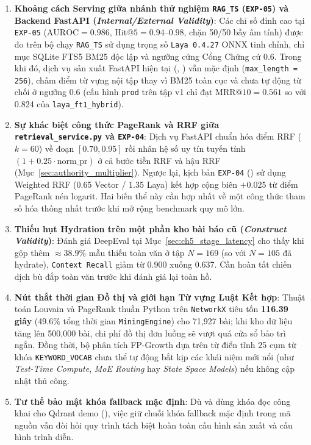 \begin{enumerate}[label=\textbf{\arabic*.}]
  \item \textbf{Khoảng cách Serving giữa nhánh thử nghiệm \texttt{RAG\_TS} (\texttt{EXP-05}) và Backend FastAPI (\textit{Internal/External Validity})}: Các chỉ số đỉnh cao tại \texttt{EXP-05} ($\mathrm{AUROC} = 0.986$, $\mathrm{Hit}@5 = 0.94\text{--}0.98$, chặn 50/50 bẫy âm tính) được đo trên bộ chạy \texttt{RAG\_TS} sử dụng trọng số \texttt{Laya 0.4.27} ONNX tinh chỉnh, chỉ mục SQLite FTS5 BM25 độc lập và ngưỡng cứng Cổng Chứng cứ 0.6. Trong khi đó, dịch vụ sản xuất FastAPI hiện tại (, ) vẫn mặc định  (\texttt{max\_length = 256}), chấm điểm từ vựng nội tập thay vì BM25 toàn cục và chưa tự động từ chối ở ngưỡng 0.6 (cấu hình \texttt{prod} trên tập v1 chỉ đạt $\mathrm{MRR}@10 = 0.561$ so với 0.824 của \texttt{laya\_ft1\_hybrid}).

  \item \textbf{Sự khác biệt công thức PageRank và RRF giữa \texttt{retrieval\_service.py} và \texttt{EXP-04}}: Dịch vụ FastAPI chuẩn hóa điểm RRF ($k=60$) về đoạn $[0.70, 0.95]$ rồi nhân hệ số uy tín tuyến tính $(1 + 0.25 \cdot \mathrm{norm\_pr})$ ở cả bước tiền RRF và hậu RRF (Mục~\ref{sec:authority_multiplier}). Ngược lại, kịch bản \texttt{EXP-04} () sử dụng Weighted RRF (0.65 Vector / 1.35 Laya) kết hợp cộng biên $+0.025$ từ điểm PageRank nén logarit. Hai biến thể này cần hợp nhất về một công thức tham số hóa thống nhất trước khi mở rộng benchmark quy mô lớn.

  \item \textbf{Thiếu hụt Hydration trên một phần kho bài báo cũ (\textit{Construct Validity})}: Đánh giá DeepEval tại Mục~\ref{sec:ch5_stage_latency} cho thấy khi gộp thêm $\approx 38.9\%$ mẫu thiếu toàn văn ở tập $N=169$ (so với $N=105$ đã hydrate), \texttt{Context Recall} giảm từ 0.900 xuống 0.637. Cần hoàn tất chiến dịch bù đắp toàn văn trước khi đánh giá lại toàn hồ.

  \item \textbf{Nút thắt thời gian Đồ thị và giới hạn Từ vựng Luật Kết hợp}: Thuật toán Louvain và PageRank thuần Python trên \texttt{NetworkX} tiêu tốn \textbf{116.39 giây} (49.6\% tổng thời gian \texttt{MiningEngine}) cho 71,927 bài; khi kho dữ liệu tăng lên 500,000 bài, chi phí đồ thị đơn luồng sẽ vượt quá cửa sổ bảo trì ngắn. Đồng thời, bộ phân tích FP-Growth dựa trên từ điển tĩnh 25 cụm từ khóa \texttt{KEYWORD\_VOCAB} chưa thể tự động bắt kịp các khái niệm mới nổi (như \textit{Test-Time Compute}, \textit{MoE Routing} hay \textit{State Space Models}) nếu không cập nhật thủ công.

  \item \textbf{Tư thế bảo mật khóa fallback mặc định}: Dù  và  dùng khóa đọc công khai cho Qdrant demo (), việc giữ chuỗi khóa fallback mặc định trong mã nguồn vẫn đòi hỏi quy trình tách biệt hoàn toàn cấu hình sản xuất và cấu hình trình diễn.
\end{enumerate}

